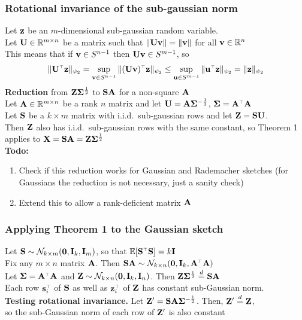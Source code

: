 \documentclass[10pt]{beamer}
\begin{document}
  \begin{frame}
    \frametitle{Rotational invariance of the sub-gaussian norm}
    Let $\z$ be an $m$-dimensional sub-gaussian random variable.\\
    Let $\U\in\R^{m\times n}$ be a matrix such that $\|\U\v\|=\|\v\|$
    for all $\v\in\R^n$\\
    This means that if $\v\in S^{n-1}$ then $\U\v\in S^{m-1}$, so
    \begin{align*}
      \|\U^\top\z\|_{\psi_2} = \sup_{\v\in
      S^{n-1}}\|(\U\v)^\top\z\|_{\psi_2}
      \leq\sup_{\u\in S^{m-1}}\|\u^\top\z\|_{\psi_2} = \|\z\|_{\psi_2}
    \end{align*}
\textbf{Reduction} from $\Z\Sigmab^{\frac12}$ to $\S\A$ for a
non-square $\A$\\[3mm]
Let $\A\in\R^{m\times n}$ be a rank $n$ matrix and let
$\U=\A\Sigmab^{-\frac12}$, $\Sigmab = \A^\top\A$\\
Let $\S$ be a $k\times m$ matrix with i.i.d.~sub-gaussian rows
and let $\Z=\S\U$.\\[2mm]

Then $\Z$ also has i.i.d.~sub-gaussian rows with the same constant,
so Theorem 1 applies to $\X=\S\A = \Z\Sigmab^{\frac12}$\\[5mm]

\textbf{Todo:}
\begin{enumerate}
\item Check if this reduction works for Gaussian and Rademacher sketches
  (for Gaussians the reduction is not necessary, just a sanity check)
\item Extend this to allow a rank-deficient matrix $\A$
\end{enumerate}
  \end{frame}

  \begin{frame}
    \frametitle{Applying Theorem 1 to the Gaussian sketch}
   Let $\S\sim\Nc_{k\times m}(\zero,\I_k,\I_m)$, so that $\E[\S^\top\S]=k\I$\\
   Fix any $m\times n$ matrix $\A$. Then $\S\A\sim
   \Nc_{k\times n}(\zero,\I_k,\A^\top\A)$\\
   Let $\Sigmab=\A^\top\A$ and $\Z\sim\Nc_{k\times n}(\zero,\I_k,\I_n)$. Then
   $\Z\Sigmab^{\frac12}\overset{d}{=}\S\A$\\
   Each row $\s_i^\top$ of $\S$ as well as $\z_i^\top$ of $\Z$
   has constant sub-Gaussian norm.\\[5mm]

   \textbf{Testing rotational invariance.}
   Let $\Z' = \S\A\Sigmab^{-\frac12}$. Then,
   $\Z'\overset{d}{=}\Z$,\\
   so the sub-Gaussian norm of each row of $\Z'$ is also constant
  \end{frame}
  
\end{document}
